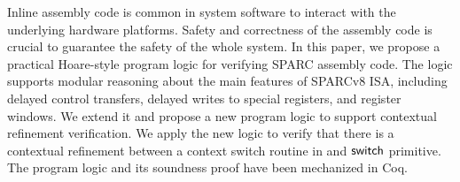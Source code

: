 Inline assembly code is common in system software to interact with
the underlying hardware platforms. Safety and correctness of the
assembly code is crucial to guarantee the safety of the whole
system. In this paper, we propose a practical Hoare-style program
logic for verifying SPARC assembly code. The logic supports
modular reasoning about the main features of SPARCv8 ISA, including
delayed control transfers, delayed writes to special registers,
and register windows. We extend it and propose a new program logic 
to support contextual refinement verification. 
We apply the new logic to verify that there is a contextual 
refinement between a context switch routine in \sparc{} and 
$\mathsf{switch}{}$ primitive. The program logic and its soundness proof 
have been mechanized in Coq. 
